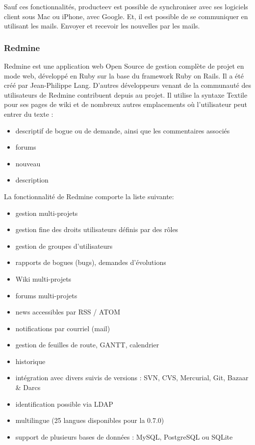 Sauf ces fonctionnalités, producteev est possible de synchroniser avec ses logiciels client sous Mac ou iPhone, avec Google. Et, il est possible de se communiquer en utilisant les mails. Envoyer et recevoir les nouvelles par les mails. 


\subsubsection{Redmine} %
\label{ssub:redmine}


Redmine est une application web Open Source de gestion complète de projet en mode web, développé en Ruby sur la base du framework Ruby on Rails.
Il a été créé par Jean-Philippe Lang. D'autres développeurs venant de la communauté des utilisateurs de Redmine contribuent depuis au projet. Il utilise la syntaxe Textile pour ses pages de wiki et de nombreux autres emplacements où l'utilisateur peut entrer du texte : 
\begin{itemize}
	\item descriptif de bogue ou de demande, ainsi que les commentaires associés
	\item forums
	\item nouveau
	\item description
\end{itemize}

La fonctionnalité de Redmine comporte la liste suivante:
\begin{itemize}
	\item gestion multi-projets
	\item gestion fine des droits utilisateurs définis par des rôles
	\item gestion de groupes d'utilisateurs
	\item rapports de bogues (bugs), demandes d'évolutions
	\item Wiki multi-projets
	\item forums multi-projets
	\item news accessibles par RSS / ATOM
	\item notifications par courriel (mail)
	\item gestion de feuilles de route, GANTT, calendrier
	\item historique
	\item intégration avec divers suivis de versions : SVN, CVS, Mercurial, Git, Bazaar \& Darcs
	\item identification possible via LDAP
	\item multilingue (25 langues disponibles pour la 0.7.0)
	\item support de plusieurs bases de données : MySQL, PostgreSQL ou SQLite
\end{itemize}

